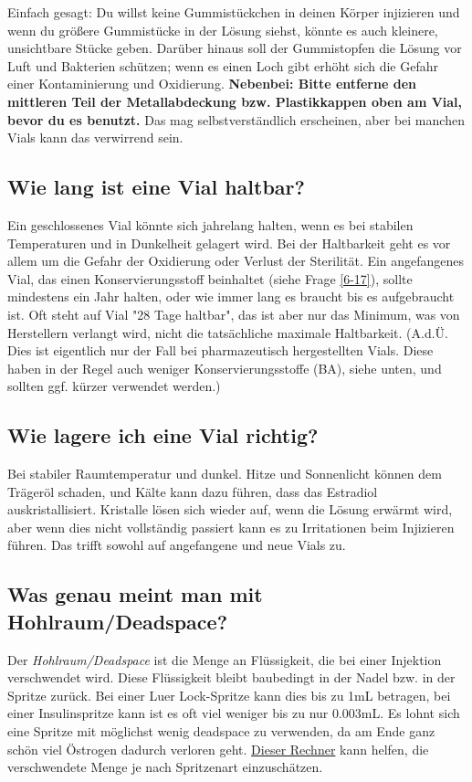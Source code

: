 \documentclass{article}
\begin{document}
Einfach gesagt: Du willst keine Gummistückchen in deinen Körper injizieren und wenn du größere Gummistücke in der Lösung siehst, könnte es auch kleinere, unsichtbare Stücke geben. Darüber hinaus soll der Gummistopfen die Lösung vor Luft und Bakterien schützen; wenn es einen Loch gibt erhöht sich die Gefahr einer Kontaminierung und Oxidierung. \textbf{Nebenbei: Bitte entferne den mittleren Teil der Metallabdeckung bzw. Plastikkappen oben am Vial, bevor du es benutzt. }Das mag selbstverständlich erscheinen, aber bei manchen Vials kann das verwirrend sein. 

\subsection{Wie lang ist eine Vial haltbar?}

Ein geschlossenes Vial könnte sich jahrelang halten, wenn es bei stabilen Temperaturen und in Dunkelheit gelagert wird. Bei der Haltbarkeit geht es vor allem um die Gefahr der Oxidierung oder Verlust der Sterilität. Ein angefangenes Vial, das einen Konservierungsstoff beinhaltet (siehe Frage \ref{6-17}), sollte mindestens ein Jahr halten, oder wie immer lang es braucht bis es aufgebraucht ist. Oft steht auf Vial "28 Tage haltbar", das ist aber nur das Minimum, was von Herstellern verlangt wird, nicht die tatsächliche maximale Haltbarkeit. (A.d.Ü. Dies ist eigentlich nur der Fall bei pharmazeutisch hergestellten Vials. Diese haben in der Regel auch weniger Konservierungsstoffe (BA), siehe unten, und sollten ggf. kürzer verwendet werden.)

\subsection{Wie lagere ich eine Vial richtig?}

Bei stabiler Raumtemperatur und dunkel. Hitze und Sonnenlicht können dem Trägeröl schaden, und Kälte kann dazu führen, dass das Estradiol auskristallisiert. Kristalle lösen sich wieder auf, wenn die Lösung erwärmt wird, aber wenn dies nicht vollständig passiert kann es zu Irritationen beim Injizieren führen. Das trifft sowohl auf angefangene und neue Vials zu.

\subsection{Was genau meint man mit Hohlraum/Deadspace?}\label{5-26}

Der \textit{Hohlraum/Deadspace} ist die Menge an Flüssigkeit, die bei einer Injektion verschwendet wird. Diese Flüssigkeit bleibt baubedingt in der Nadel bzw. in der Spritze zurück. Bei einer Luer Lock-Spritze kann dies bis zu 1mL betragen, bei einer Insulinspritze kann ist es oft viel weniger bis zu nur 0.003mL. Es lohnt sich eine Spritze mit möglichst wenig deadspace zu verwenden, da am Ende ganz schön viel Östrogen dadurch verloren geht. \href{https://hrtcafe.net/Calc/}{Dieser Rechner} kann helfen, die verschwendete Menge je nach Spritzenart einzuschätzen.
\end{document}
